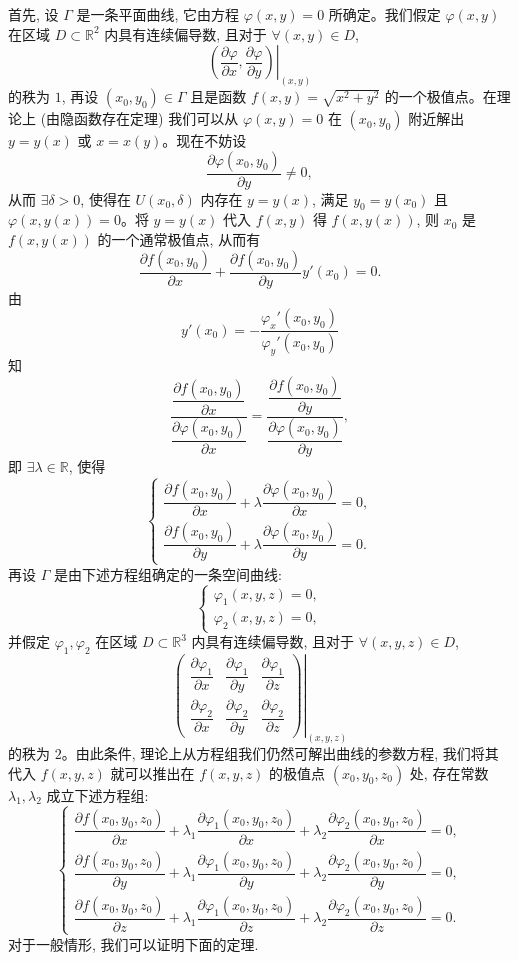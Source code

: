 首先, 设 $\Gamma$ 是一条平面曲线, 它由方程 $\varphi(x,y)=0$ 所确定。我们假定 $\varphi(x,y)$ 在区域 $D\subset\mathbb R^2$ 内具有连续偏导数, 且对于 $\forall(x,y)\in D$,
\[
  \left.
  \left(\frac{\partial\varphi}{\partial x},\frac{\partial\varphi}{\partial y}\right)
  \right|_{(x,y)}
\]
的秩为 $1$, 再设 $(x_0,y_0)\in\Gamma$ 且是函数 $f(x,y)=\sqrt{x^2+y^2}$ 的一个极值点。在理论上 (由隐函数存在定理) 我们可以从 $\varphi(x,y)=0$ 在 $(x_0,y_0)$ 附近解出 $y=y(x)$ 或 $x=x(y)$。现在不妨设
\[
  \frac{\partial\varphi(x_0,y_0)}{\partial y}\ne0,
\]
从而 $\exists\delta>0$, 使得在 $U(x_0,\delta)$ 内存在 $y=y(x)$, 满足 $y_0=y(x_0)$ 且 $\varphi(x,y(x))=0$。将 $y=y(x)$ 代入 $f(x,y)$ 得 $f(x,y(x))$, 则 $x_0$ 是 $f(x,y(x))$ 的一个通常极值点, 从而有
\[
  \frac{\partial f(x_0,y_0)}{\partial x}
  +
  \frac{\partial f(x_0,y_0)}{\partial y}y'(x_0)=0.
\]
由
\[
  y'(x_0)=-\frac{\varphi_x'(x_0,y_0)}{\varphi_y'(x_0,y_0)}
\]
知
\[
  \frac{\dfrac{\partial f(x_0,y_0)}{\partial x}}
       {\dfrac{\partial\varphi(x_0,y_0)}{\partial x}}
  =
  \frac{\dfrac{\partial f(x_0,y_0)}{\partial y}}
       {\dfrac{\partial\varphi(x_0,y_0)}{\partial y}},
\]
即 $\exists\lambda\in\mathbb R$, 使得
\[
  \begin{cases}
    \dfrac{\partial f(x_0,y_0)}{\partial x}
    +\lambda\dfrac{\partial\varphi(x_0,y_0)}{\partial x}=0,\\[1.2ex]
    \dfrac{\partial f(x_0,y_0)}{\partial y}
    +\lambda\dfrac{\partial\varphi(x_0,y_0)}{\partial y}=0.
  \end{cases}
\]
再设 $\Gamma$ 是由下述方程组确定的一条空间曲线:
\[
  \begin{cases}
    \varphi_1(x,y,z)=0,\\
    \varphi_2(x,y,z)=0,
  \end{cases}
\]
并假定 $\varphi_1,\varphi_2$ 在区域 $D\subset\mathbb R^3$ 内具有连续偏导数, 且对于 $\forall(x,y,z)\in D$,
\[
  \left.
  \begin{pmatrix}
    \dfrac{\partial\varphi_1}{\partial x} &
    \dfrac{\partial\varphi_1}{\partial y} &
    \dfrac{\partial\varphi_1}{\partial z}\\
    \dfrac{\partial\varphi_2}{\partial x} &
    \dfrac{\partial\varphi_2}{\partial y} &
    \dfrac{\partial\varphi_2}{\partial z}
  \end{pmatrix}
  \right|_{(x,y,z)}
\]
的秩为 $2$。由此条件, 理论上从方程组我们仍然可解出曲线的参数方程, 我们将其代入 $f(x,y,z)$ 就可以推出在 $f(x,y,z)$ 的极值点 $(x_0,y_0,z_0)$ 处, 存在常数 $\lambda_1,\lambda_2$ 成立下述方程组:
\[
  \begin{cases}
    \dfrac{\partial f(x_0,y_0,z_0)}{\partial x}
    +\lambda_1\dfrac{\partial\varphi_1(x_0,y_0,z_0)}{\partial x}
    +\lambda_2\dfrac{\partial\varphi_2(x_0,y_0,z_0)}{\partial x}=0,\\[1.2ex]
    \dfrac{\partial f(x_0,y_0,z_0)}{\partial y}
    +\lambda_1\dfrac{\partial\varphi_1(x_0,y_0,z_0)}{\partial y}
    +\lambda_2\dfrac{\partial\varphi_2(x_0,y_0,z_0)}{\partial y}=0,\\[1.2ex]
    \dfrac{\partial f(x_0,y_0,z_0)}{\partial z}
    +\lambda_1\dfrac{\partial\varphi_1(x_0,y_0,z_0)}{\partial z}
    +\lambda_2\dfrac{\partial\varphi_2(x_0,y_0,z_0)}{\partial z}=0.
  \end{cases}
\]
对于一般情形, 我们可以证明下面的定理.

